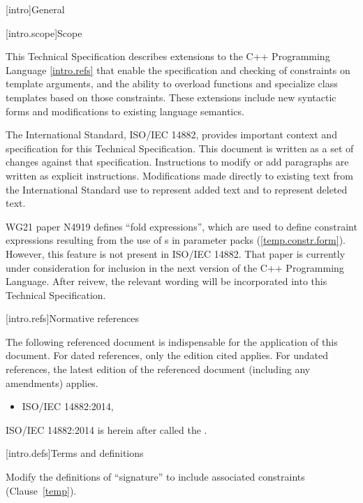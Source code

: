 
[intro]{General}

[intro.scope]{Scope}

\pnum
This Technical Specification describes extensions to the C++ 
Programming Language \ref{intro.refs} that
enable the specification and checking of constraints on template 
arguments, and the ability to overload functions and specialize
class templates based on those constraints. These extensions include 
new syntactic forms and modifications to existing language semantics.

\pnum
The International Standard, ISO/IEC 14882, provides important context
and specification for this Technical Specification. This document is 
written as a set of changes against that specification. Instructions
to modify or add paragraphs are written as explicit instructions. 
Modifications made directly to existing text from the International
Standard use  to represent added text and
 to represent deleted text.

\pnum
WG21 paper N4919 defines ``fold expressions'', which are used to define 
constraint expressions resulting from the use of 
s in parameter packs 
(\ref{temp.constr.form}). However, this feature is not present in ISO/IEC 14882. 
% 
That paper is currently under consideration for inclusion in the next version
of the C++ Programming Language. After reivew, the relevant wording will
be incorporated into this Technical Specification.


[intro.refs]{Normative references}

\pnum
The following referenced document is indispensable for the
application of this document. For dated references, only the
edition cited applies. For undated references, the latest edition
of the referenced document (including any amendments) applies.

\begin{itemize}
\item ISO/IEC 14882:2014, 
\end{itemize}

ISO/IEC 14882:2014 is herein after called the .

[intro.defs]{Terms and definitions}

Modify the definitions of ``signature'' to include associated
constraints (Clause~\ref{temp}).

